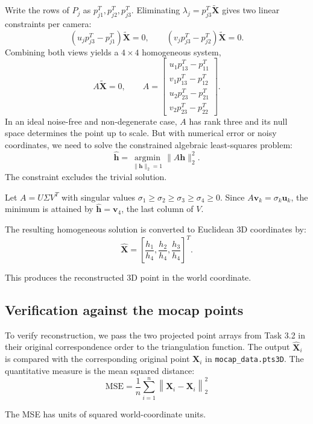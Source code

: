 \documentclass[11pt,letterpaper]{article}
\begin{document}
Write the rows of $P_j$ as $p_{j1}^T , p_{j2}^T , p_{j3}^T$. Eliminating $\lambda_j = p_{j3}^T \widetilde{\mathbf{X}}$ gives two linear constraints per camera:
\[
    (u_j p_{j3}^T - p_{j1}^T)\widetilde{\mathbf{X}}=0,
    \qquad
    (v_j p_{j3}^T - p_{j2}^T)\widetilde{\mathbf{X}}=0.
\]
Combining both views yields a $4\times4$ homogeneous system,
\[
    A\widetilde{\mathbf{X}}=0,
    \qquad
    A=\begin{bmatrix}
        u_1 p_{13}^T - p_{11}^T\\
        v_1 p_{13}^T - p_{12}^T\\
        u_2 p_{23}^T - p_{21}^T\\
        v_2 p_{23}^T - p_{22}^T
    \end{bmatrix}.
\]
In an ideal noise-free and non-degenerate case, $A$ has rank three and its null space determines the point up to scale. But with numerical error or noisy coordinates, we need to solve the constrained algebraic least-squares problem:
\[
    \widehat{\mathbf{h}} = \underset{\| \mathbf{h} \|_2 = 1}{\operatorname{argmin}}\| A \mathbf{h} \|_2^2.
\]
The constraint excludes the trivial solution. 

Let
$A = U \Sigma V^T$ with singular values $\sigma_1 \geq \sigma_2 \geq \sigma_3 \geq \sigma_4 \geq 0$. Since $A \mathbf{v}_k = \sigma_k \mathbf{u}_k$, the minimum is attained by
$\widehat{\mathbf{h}}=\mathbf{v}_4$, the last column of $V$.

The resulting homogeneous solution is converted to Euclidean 3D coordinates by:
\[
\widehat {\mathbf{X}} = 
\left[
\frac{h_1}{h_4},
\frac{h_2}{h_4},
\frac{h_3}{h_4}
\right]^T.
\]

This produces the reconstructed 3D point in the world coordinate.

\clearpage

\subsection*{Verification against the mocap points}
To verify reconstruction, we pass the two projected point arrays from Task 3.2 in their original correspondence order to the triangulation function. The output $\widehat{\mathbf{X}}_i$ is compared with the corresponding original point $\mathbf{X}_i$ in \texttt{mocap\_data.pts3D}. The quantitative measure is the mean squared distance:
\[
    \mathrm{MSE} = \frac{1}{n} \sum_{i=1}^{n} \left\| \widehat{\mathbf{X}}_i - \mathbf{X}_i \right\|_2^2
\]

The MSE has units of squared world-coordinate units.
\end{document}
